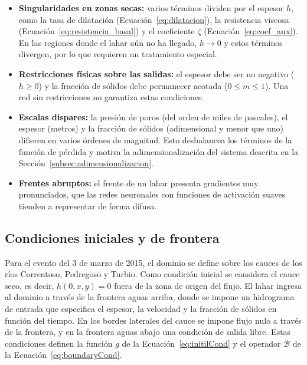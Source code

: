 \begin{itemize}
    \item \textbf{Singularidades en zonas secas:} varios términos dividen por el espesor $h$, como la tasa de dilatación (Ecuación~\eqref{eq:dilatacion}), la resistencia viscosa (Ecuación~\eqref{eq:resistencia_basal}) y el coeficiente $\zeta$ (Ecuación~\eqref{eq:coef_aux}). En las regiones donde el lahar aún no ha llegado, $h \to 0$ y estos términos divergen, por lo que requieren un tratamiento especial.
    \item \textbf{Restricciones físicas sobre las salidas:} el espesor debe ser no negativo ($h \geq 0$) y la fracción de sólidos debe permanecer acotada ($0 \leq m \leq 1$). Una red sin restricciones no garantiza estas condiciones.
    \item \textbf{Escalas dispares:} la presión de poros (del orden de miles de pascales), el espesor (metros) y la fracción de sólidos (adimensional y menor que uno) difieren en varios órdenes de magnitud. Esto desbalancea los términos de la función de pérdida \cite{wang2021understanding} y motiva la adimensionalización del sistema descrita en la Sección~\ref{subsec:adimensionalizacion}.
    \item \textbf{Frentes abruptos:} el frente de un lahar presenta gradientes muy pronunciados, que las redes neuronales con funciones de activación suaves tienden a representar de forma difusa.
\end{itemize}

\subsection{Condiciones iniciales y de frontera}
\label{subsec:condiciones}

Para el evento del 3 de marzo de 2015, el dominio se define sobre los cauces de los ríos Correntoso, Pedregoso y Turbio. Como condición inicial se considera el cauce seco, es decir, $h(0,x,y) = 0$ fuera de la zona de origen del flujo. El lahar ingresa al dominio a través de la frontera aguas arriba, donde se impone un hidrograma de entrada que especifica el espesor, la velocidad y la fracción de sólidos en función del tiempo. En los bordes laterales del cauce se impone flujo nulo a través de la frontera, y en la frontera aguas abajo una condición de salida libre. Estas condiciones definen la función $g$ de la Ecuación~\eqref{eq:initilCond} y el operador $\mathcal{B}$ de la Ecuación~\eqref{eq:boundaryCond}.

